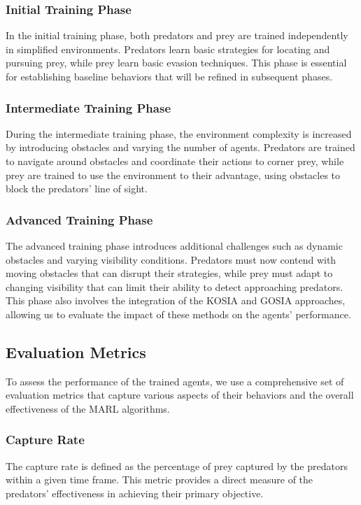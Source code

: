 \documentclass[sn-mathphys-num]{sn-jnl}%
\theoremstyle{thmstyleone}%
\theoremstyle{thmstyletwo}%
\theoremstyle{thmstylethree}%
\begin{document}
\subsubsection{Initial Training Phase}
In the initial training phase, both predators and prey are trained independently in simplified environments. Predators learn basic strategies for locating and pursuing prey, while prey learn basic evasion techniques. This phase is essential for establishing baseline behaviors that will be refined in subsequent phases.

\subsubsection{Intermediate Training Phase}
During the intermediate training phase, the environment complexity is increased by introducing obstacles and varying the number of agents. Predators are trained to navigate around obstacles and coordinate their actions to corner prey, while prey are trained to use the environment to their advantage, using obstacles to block the predators' line of sight.

\subsubsection{Advanced Training Phase}
The advanced training phase introduces additional challenges such as dynamic obstacles and varying visibility conditions. Predators must now contend with moving obstacles that can disrupt their strategies, while prey must adapt to changing visibility that can limit their ability to detect approaching predators. This phase also involves the integration of the KOSIA and GOSIA approaches, allowing us to evaluate the impact of these methods on the agents' performance.

\subsection{Evaluation Metrics}
To assess the performance of the trained agents, we use a comprehensive set of evaluation metrics that capture various aspects of their behaviors and the overall effectiveness of the MARL algorithms.

\subsubsection{Capture Rate}
The capture rate is defined as the percentage of prey captured by the predators within a given time frame. This metric provides a direct measure of the predators' effectiveness in achieving their primary objective.
\end{document}
